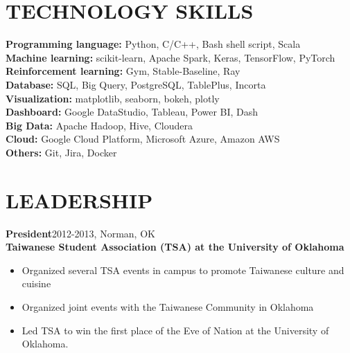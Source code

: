 \documentclass[margin, 10pt]{res} %
\begin{document}
\begin{resume}
\section{TECHNOLOGY SKILLS} 
\textbf{Programming language:} Python, C/C++, Bash shell script, Scala\\
\textbf{Machine learning:} scikit-learn, Apache Spark, Keras, TensorFlow, PyTorch\\
\textbf{Reinforcement learning:} Gym, Stable-Baseline, Ray\\
\textbf{Database:} SQL, Big Query, PostgreSQL, TablePlus, Incorta\\
\textbf{Visualization:} matplotlib, seaborn, bokeh, plotly\\
\textbf{Dashboard:} Google DataStudio, Tableau, Power BI, Dash\\
\textbf{Big Data:} Apache Hadoop, Hive, Cloudera\\
\textbf{Cloud:} Google Cloud Platform, Microsoft Azure, Amazon AWS\\
\textbf{Others:} Git, Jira, Docker\\


\section{LEADERSHIP}

\textbf{President}\hfill{2012-2013, Norman, OK}\\
\textbf{Taiwanese Student Association (TSA) at the University of Oklahoma}\hfill{}
\begin{itemize}
    \item Organized several TSA events in campus to promote Taiwanese culture and cuisine
    \item Organized joint events with the Taiwanese Community in Oklahoma
    \item Led TSA to win the first place of the Eve of Nation at the University of Oklahoma.
\end{itemize}

 



\end{resume}
\end{document}
